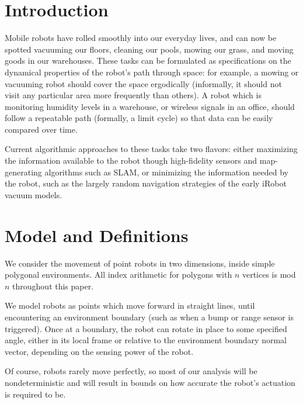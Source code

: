 \documentclass[]{styles/svproc}  %
\begin{document}
\section{Introduction}

Mobile robots have rolled smoothly into our everyday lives, and can now be
spotted vacuuming our floors, cleaning our pools, mowing our grass, and moving
goods in our warehouses. These tasks can be formulated as specifications on the
dynamical properties of the robot's path through space: for example, a mowing or
vacuuming robot should cover the space ergodically (informally, it should not visit 
any particular area more frequently than others). A robot which is monitoring
humidity levels in a warehouse, or wireless signals in an office, should follow
a repeatable path (formally, a limit cycle) so that data can be easily compared 
over time.

Current algorithmic approaches to these tasks take two flavors: either
maximizing the information available to the robot though high-fidelity sensors
and map-generating algorithms such as SLAM, or minimizing the information needed
by the robot, such as the largely random navigation strategies of the early
iRobot vacuum models.




\section{Model and Definitions}

We consider the movement of point robots in two dimensions, inside simple polygonal
environments. All index arithmetic for polygons with $n$ vertices is mod $n$ 
throughout this paper.

We model robots as points which move forward in straight lines, until encountering 
an environment boundary (such as when a bump or range
sensor is triggered). Once at a boundary, the robot can rotate in place to some
specified angle, either in its local frame or relative to the environment
boundary normal vector, depending on the sensing power of the robot.

Of course, robots rarely move perfectly, so most of our analysis will be
nondeterministic and will result in bounds on how accurate the robot's actuation
is required to be.
\end{document}
